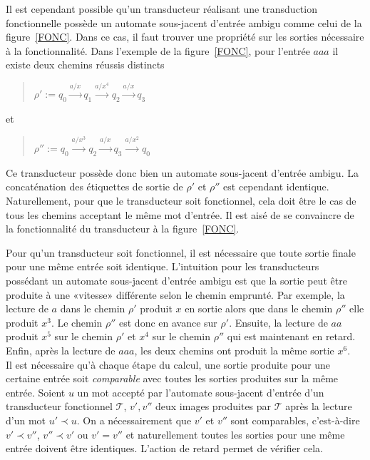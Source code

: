 	Il est cependant possible qu'un transducteur réalisant une transduction fonctionnelle possède un automate sous-jacent d'entrée ambigu comme celui de la figure~\ref{FONC}. Dans ce cas, il faut trouver une propriété sur les sorties nécessaire à la fonctionnalité. Dans l'exemple de la figure~\ref{FONC}, pour l'entrée $aaa$ il existe deux chemins réussis distincts \\
	\begin{quotation}
		$\rho' := q_0 \xrightarrow{a/x} q_1 \xrightarrow{a/x^4} q_2 \xrightarrow{a/x} q_3$
	\end{quotation}
	et
	\begin{quotation}
		$\rho'' := q_0 \xrightarrow{a/x^3} q_2 \xrightarrow{a/x} q_3 \xrightarrow{a/x^2} q_0$ \\
	\end{quotation}
	
	Ce transducteur possède donc bien un automate sous-jacent d'entrée ambigu. La concaténation des étiquettes de sortie de $\rho'$ et $\rho''$ est cependant identique. Naturellement, pour que le transducteur soit fonctionnel, cela doit être le cas de tous les chemins acceptant le même mot d'entrée. Il est aisé de se convaincre de la fonctionnalité du transducteur à la figure~\ref{FONC}.
	
	
	
	Pour qu'un transducteur soit fonctionnel, il est nécessaire que toute sortie finale pour une même entrée soit identique. L'intuition pour les transducteurs possédant un automate sous-jacent d'entrée ambigu est que la sortie peut être produite à une «vitesse» différente selon le chemin emprunté. Par exemple, la lecture de $a$ dans le chemin $\rho'$ produit $x$ en sortie alors que dans le chemin $\rho''$ elle produit $x^3$. Le chemin $\rho''$ est donc en avance sur $\rho'$. Ensuite, la lecture de $aa$ produit $x^5$ sur le chemin $\rho'$ et $x^4$ sur le chemin $\rho''$ qui est maintenant en retard. Enfin, après la lecture de $aaa$, les deux chemins ont produit la même sortie $x^6$. \\
	Il est nécessaire qu'à chaque étape du calcul, une sortie produite pour une certaine entrée soit \emph{comparable} avec toutes les sorties produites sur la même entrée. Soient $u$ un mot accepté par l'automate sous-jacent d'entrée d'un transducteur fonctionnel $\mathscr{T}$, $v',v''$ deux images produites par $\mathscr{T}$ après la lecture d'un mot $u' \prec u$. On a nécessairement que $v'$ et $v''$ sont comparables, c'est-à-dire $v' \prec v''$, $v'' \prec v'$ ou $v' = v''$ et naturellement toutes les sorties pour une même entrée doivent être identiques. L'action de retard permet de vérifier cela.
	
